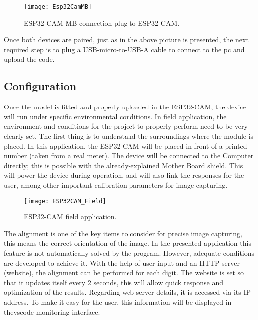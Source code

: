 \begin{figure}  [H]
	\begin{center}
		\texttt{[image: Esp32CamMB]}
		\caption{ESP32-CAM-MB connection plug to ESP32-CAM.} 
		\label{fig:ESP32-CAM-MB connection plug to ESP32-CAM.}
	\end{center}
\end{figure}	


Once both devices are paired, just as in the above picture is presented, the next required step is to plug a USB-micro-to-USB-A cable to connect to the \ac{pc} and upload the code.  

\subsection{Configuration}
Once the model is fitted and properly uploaded in the ESP32-CAM, the device will run under specific environmental conditions. In field application, the environment and conditions for the project to properly perform need to be very clearly set. The first thing is to understand the surroundings where the module is placed. In this application, the ESP32-CAM will be placed in front of a printed number (taken from a real meter). The device will be connected to the Computer directly; this is possible with the already-explained Mother Board shield. This will power the device during operation, and will also link the responses for the user, among other important calibration parameters for image capturing. \\

\begin{figure}  [H]
	\begin{center}
		\texttt{[image: ESP32CAM\_Field]}
		\caption{ESP32-CAM field application.} 
		\label{fig:ESP32-CAM field application.}
	\end{center}
\end{figure}	


The alignment is one of the key items to consider for precise image capturing, this means the correct orientation of the image. In the presented application this feature is not automatically solved by the program. However, adequate conditions are developed to achieve it. With the help of user input and an HTTP server (website), the alignment can be performed for each digit. The website is set so that it updates itself every 2 seconds, this will allow quick response and optimization of the results. Regarding web server details, it is accessed via its IP address. To make it easy for the user, this information will be displayed in the\ac{vscode} monitoring interface.\\

